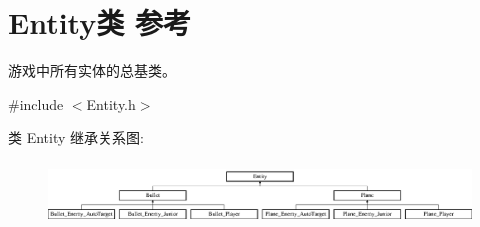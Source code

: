 \hypertarget{class_entity}{}\section{Entity类 参考}
\label{class_entity}


游戏中所有实体的总基类。  




{\ttfamily \#include $<$Entity.\+h$>$}

类 Entity 继承关系图\+:\begin{figure}[H]
\begin{center}
\leavevmode
\includegraphics[height=1.686747cm]{class_entity}
\end{center}
\end{figure}
